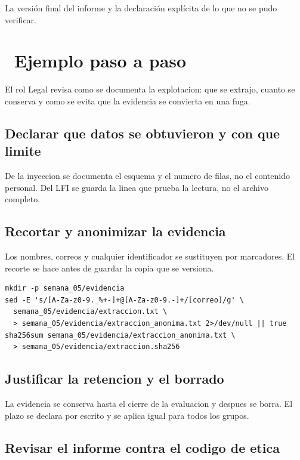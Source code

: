 \documentclass[11pt,a4paper]{article}
\newcommand{\iconotexto}[2]{\textcolor{cyanNeon}{\faIcon{#1}}~#2}
\begin{document}
La versión final del informe y la declaración explícita de lo que no se pudo verificar.

\section{\iconotexto{list-ol}{Ejemplo paso a paso}}

El rol Legal revisa como se documenta la explotacion: que se extrajo, cuanto se conserva y como se evita que la evidencia se convierta en una fuga.

\subsection{Declarar que datos se obtuvieron y con que limite}

De la inyeccion se documenta el esquema y el numero de filas, no el contenido personal. Del LFI se guarda la linea que prueba la lectura, no el archivo completo.

\subsection{Recortar y anonimizar la evidencia}

Los nombres, correos y cualquier identificador se sustituyen por marcadores. El recorte se hace antes de guardar la copia que se versiona.

\begin{lstlisting}[style=estiloCodigo]
mkdir -p semana_05/evidencia
sed -E 's/[A-Za-z0-9._%+-]+@[A-Za-z0-9.-]+/[correo]/g' \
  semana_05/evidencia/extraccion.txt \
  > semana_05/evidencia/extraccion_anonima.txt 2>/dev/null || true
sha256sum semana_05/evidencia/extraccion_anonima.txt \
  > semana_05/evidencia/extraccion.sha256
\end{lstlisting}

\subsection{Justificar la retencion y el borrado}

La evidencia se conserva hasta el cierre de la evaluacion y despues se borra. El plazo se declara por escrito y se aplica igual para todos los grupos.

\subsection{Revisar el informe contra el codigo de etica}
\end{document}
